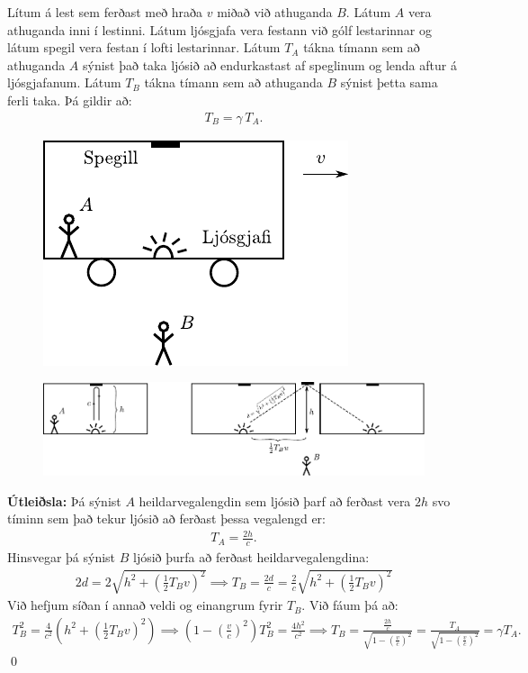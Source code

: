 \ifdefined \wholebook \else\documentclass[oneside]{book}\usepackage{EdlBook}\graphicspath{{figures/}}
\begin{document}
\begin{tcolorbox}
\begin{theorem}
Lítum á lest sem ferðast með hraða $v$ miðað við athuganda $B$. Látum $A$ vera athuganda inni í lestinni. Látum ljósgjafa vera festann við gólf lestarinnar og látum spegil vera festan í lofti lestarinnar. Látum $T_A$ tákna tímann sem að athuganda $A$ sýnist það taka ljósið að endurkastast af speglinum og lenda aftur á ljósgjafanum. Látum $T_B$ tákna tímann sem að athuganda $B$ sýnist þetta sama ferli taka. Þá gildir að:
\begin{align*}
    T_B = \gamma \, T_A.
\end{align*}
\end{theorem}
\begin{figure}[H]
    \centering
    \includegraphics{figures/trains-einstein1.pdf}
\end{figure}
\end{tcolorbox}

\begin{figure}[H]
    \centering
    \includegraphics{figures/trains-einstein1c.pdf}
\end{figure}

\textbf{Útleiðsla:} Þá sýnist $A$ heildarvegalengdin sem ljósið þarf að ferðast vera $2h$ svo tíminn sem það tekur ljósið að ferðast þessa vegalengd er:
\begin{align*}
    T_A = \frac{2h}{c}.
\end{align*}
Hinsvegar þá sýnist $B$ ljósið þurfa að ferðast heildarvegalengdina:
\begin{align*}
    2d = 2\sqrt{h^2 + \left(\frac{1}{2}T_B v\right)^2} \implies T_B = \frac{2d}{c} = \frac{2}{c}\sqrt{h^2 + \left(\frac{1}{2}T_B v\right)^2}
\end{align*}
Við hefjum síðan í annað veldi og einangrum fyrir $T_B$. Við fáum þá að:
\begin{align*}
    T_B^2 = \frac{4}{c^2}\left(h^2 + \left(\frac{1}{2}T_B v\right)^2 \right) \implies \left(1- \left(\frac{v}{c}\right)^2 \right)T_B^2 = \frac{4h^2}{c^2} \implies T_B = \frac{\frac{2h}{c}}{\sqrt{1- \left( \frac{v}{c} \right)^2}} = \frac{T_A}{\sqrt{1- \left( \frac{v}{c} \right)^2}} = \gamma T_A.
\end{align*}
\qed
\end{document}
